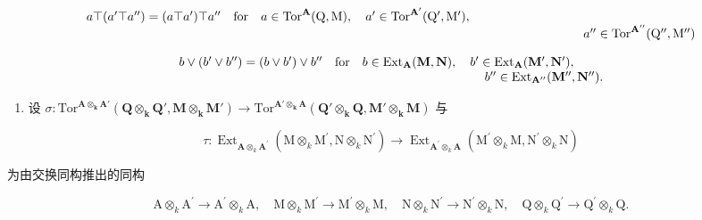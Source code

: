 \[
\begin{array}{l l} a \top (a ^ {\prime} \top a ^ {\prime \prime}) = (a \top a ^ {\prime}) \top a ^ {\prime \prime} & \text {for} \quad a \in \operatorname{Tor} ^ {\mathbf {A}} (\mathrm{Q}, \mathrm{M}), \quad a ^ {\prime} \in \operatorname{Tor} ^ {\mathbf {A} ^ {\prime}} (\mathrm{Q} ^ {\prime}, \mathrm{M} ^ {\prime}), \\ & \qquad \qquad \qquad \qquad \qquad \qquad \qquad \qquad \qquad \qquad \qquad \qquad \qquad \qquad a ^ {\prime \prime} \in \operatorname{Tor} ^ {\mathbf {A} ^ {\prime \prime}} (\mathrm{Q} ^ {\prime \prime}, \mathrm{M} ^ {\prime \prime}) \end{array}
\]

\[
\begin{array}{r l} b \vee (b ^ {\prime} \vee b ^ {\prime \prime}) = (b \vee b ^ {\prime}) \vee b ^ {\prime \prime} & \text {for} \quad b \in \operatorname{Ext} _ {\mathbf {A}} (\mathbf {M}, \mathbf {N}), \quad b ^ {\prime} \in \operatorname{Ext} _ {\mathbf {A}} (\mathbf {M} ^ {\prime}, \mathbf {N} ^ {\prime}), \\ & \qquad \qquad \qquad \qquad \qquad \qquad b ^ {\prime \prime} \in \operatorname{Ext} _ {\mathbf {A} ^ {\prime \prime}} (\mathbf {M} ^ {\prime \prime}, \mathbf {N} ^ {\prime \prime}). \end{array}
\]

\begin{enumerate}
\def\labelenumi{\alph{enumi})}
\setcounter{enumi}{3}
\tightlist
\item
  设 \(\sigma : \mathrm{Tor}^{\mathbf{A} \otimes_{\mathbf{k}} \mathbf{A}'}(\mathbf{Q} \otimes_{\mathbf{k}} \mathbf{Q}', \mathbf{M} \otimes_{\mathbf{k}} \mathbf{M}') \to \mathrm{Tor}^{\mathbf{A}' \otimes_{\mathbf{k}} \mathbf{A}}(\mathbf{Q}' \otimes_{\mathbf{k}} \mathbf{Q}, \mathbf{M}' \otimes_{\mathbf{k}} \mathbf{M})\) 与
\end{enumerate}

\[
\tau : \operatorname{Ext} _ {\mathbf {A} \otimes_ {k} \mathbf {A} ^ {\prime}} (\mathrm{M} \otimes_ {k} \mathrm{M} ^ {\prime}, \mathrm{N} \otimes_ {k} \mathrm{N} ^ {\prime}) \rightarrow \operatorname{Ext} _ {\mathbf {A} ^ {\prime} \otimes_ {k} \mathbf {A}} (\mathrm{M} ^ {\prime} \otimes_ {k} \mathrm{M}, \mathrm{N} ^ {\prime} \otimes_ {k} \mathrm{N})
\]

为由交换同构推出的同构

\[
\mathrm{A} \otimes_ {k} \mathrm{A} ^ {\prime} \rightarrow \mathrm{A} ^ {\prime} \otimes_ {k} \mathrm{A}, \quad \mathrm{M} \otimes_ {k} \mathrm{M} ^ {\prime} \rightarrow \mathrm{M} ^ {\prime} \otimes_ {k} \mathrm{M}, \quad \mathrm{N} \otimes_ {k} \mathrm{N} ^ {\prime} \rightarrow \mathrm{N} ^ {\prime} \otimes_ {k} \mathrm{N}, \quad \mathrm{Q} \otimes_ {k} \mathrm{Q} ^ {\prime} \rightarrow \mathrm{Q} ^ {\prime} \otimes_ {k} \mathrm{Q}.
\]

